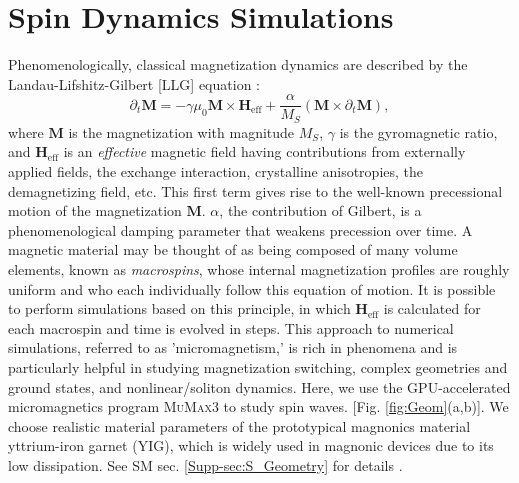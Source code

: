 \documentclass[aps,prx,twocolumn,superscriptaddress,floatfix]{revtex4-2}
\begin{document}
\section{Spin Dynamics Simulations}
Phenomenologically, classical magnetization dynamics are described by the Landau-Lifshitz-Gilbert [LLG] equation \cite{landau_theory_1935, gilbert_phenomenological_2004}: 
\begin{equation}
    \partial_t\mathbf{M}=-\gamma\mu_0\mathbf{M}\times\mathbf{H}_{\text{eff}} + \dfrac{\alpha}
{M_S}\left(\mathbf{M}\times\partial_t\mathbf{M}\right),
\end{equation}
where $\mathbf{M}$ is the magnetization with magnitude $M_S$, $\gamma$ is the gyromagnetic ratio, and $\mathbf{H}_{\text{eff}}$ is an \textit{effective} magnetic field having contributions from externally applied fields, the exchange interaction, crystalline anisotropies, the demagnetizing field, etc. This first term gives rise to the well-known precessional motion of the magnetization $\mathbf{M}$. $\alpha$, the contribution of Gilbert, is a phenomenological damping parameter that weakens precession over time. A magnetic material may be thought of as being composed of many volume elements, known as \textit{macrospins}, whose internal magnetization profiles are roughly uniform and who each individually follow this equation of motion. It is possible to perform simulations based on this principle, in which $\mathbf{H}_{\text{eff}}$ is calculated for each macrospin and time is evolved in steps. This approach to numerical simulations, referred to as 'micromagnetism,' \cite{brown_micromagnetics_1963} is rich in phenomena and is particularly helpful in studying magnetization switching, complex geometries and ground states, and nonlinear/soliton dynamics. Here, we use the GPU-accelerated micromagnetics program \textsc{MuMax}3 \cite{vansteenkiste_design_2014} to study spin waves. [Fig. \ref{fig:Geom}(a,b)]. We choose realistic material parameters of the prototypical magnonics material yttrium-iron garnet (YIG), which is widely used in magnonic devices due to its low dissipation. See SM sec. \ref{Supp-sec:S_Geometry} for details \cite{Supplemental}.
\end{document}
